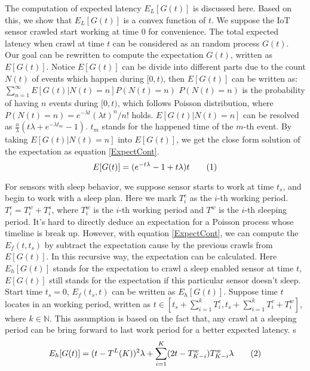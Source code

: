 \documentclass[conference]{IEEEtran}
\newcommand\numberthis{\addtocounter{equation}{1}\tag{\theequation}}
\begin{document}
The computation of expected latency $E_L[G(t)]$ is discussed here.
Based on this, we show that $E_L[G(t)]$ is a convex function of $t$.
We suppose the IoT sensor crawled start working at time $0$ for convenience. 
The total expected latency when crawl at time $t$ can be considered as an random process $G(t)$. Our goal can be rewritten to compute the expectation $G(t)$, written as $E[G(t)]$. 
Notice $E[G(t)]$ can be divide into different parts due to the count $N(t)$ of events which happen during $[0, t)$, then $E[G(t)]$ can be written as: $\sum_{n=1}^{\infty} E[G(t)|N(t)=n]P(N(t)=n)$
$P(N(t)=n)$ is the probability of having $n$ events during $[0,t)$, which follows Poisson distribution, where $P(N(t)=n)=e^{-\lambda t}{(\lambda t)^n}/{n!}$ holds. 
$E[G(t)|N(t)=n]$ can be resolved as $\frac{n}{\lambda}(t\lambda+e^{-\lambda t_m}-1)$. 
$t_{m}$ stands for the happened time of the $m$-th event. 
By taking $E[G(t)|N(t)=n]$ into $E[G(t)]$, we get the close form solution of the expectation as equation \eqref{ExpectCont}.
\begin{equation}
E[G(t)] = (e^{-t\lambda}-1+t \lambda)t \numberthis \label{ExpectCont}
\end{equation}

For sensors with sleep behavior, we suppose sensor starts to work at time $t_s$, and begin to work with a sleep plan.
Here we mark $T^{c}_{i}$ as the $i$-th working period. 
$T^{c}_{i} = T^{w}_{i}+T^{s}_{i}$, where $T^{w}_{i}$ is the $i$-th working period and $T^{w}$ is the $i$-th sleeping period. 
It's hard to directly deduce an expectation for a Poisson process whose timeline is break up.
However, with equation \eqref{ExpectCont}, we can compute the $E_f(t, t_s)$ by subtract the expectation cause by the previous crawls from $E[G(t)]$. 
In this recursive way, the expectation can be calculated. 
Here $E_h[G(t)]$ stands for the expectation to crawl a sleep enabled sensor at time $t$, $E[G(t)]$ still stands for the expectation if this particular sensor doesn't sleep.
Start time $t_s=0$, $E_f(t_s,t)$ can be written as $E_h[G(t)]$.
Suppose time $t$ locates in an working period, written as $t \in [t_s + \sum_{i=1}^{k} T^{c}_{i}, t_s + \sum_{i=1}^{k} T^{c}_{i} + T^{w}_{i}]$, where $k\in\mathbb{N}$. 
This assumption is based on the fact that, any crawl at a sleeping period can be bring forward to last work period for a better expected latency.
s\begin{equation}
E_h[G(t)] = (t-T^{L}(K))^2\lambda + \sum_{i=1}^{K} (2 t - T^{w}_{K-i})T^{w}_{K-i}\lambda 
	\numberthis \label{ExpectSleep}
\end{equation}
\end{document}
